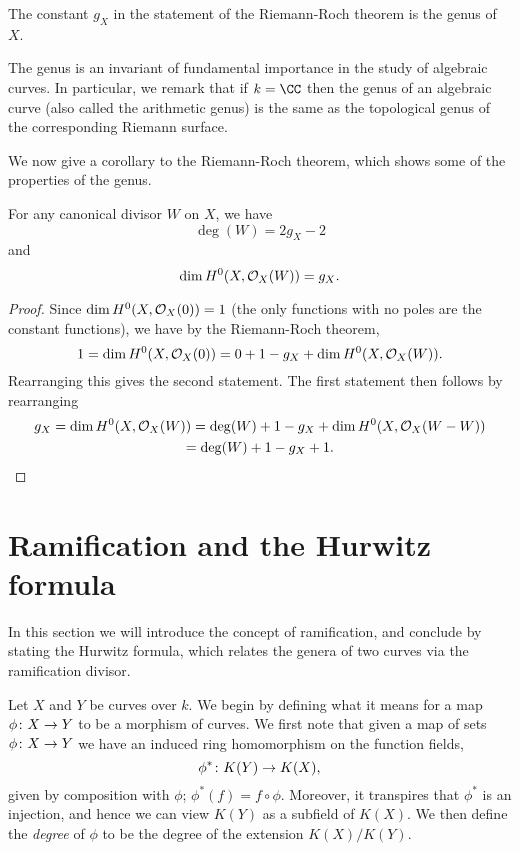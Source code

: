     \begin{defn}
    The constant $g_X$ in the statement of the Riemann-Roch theorem is the genus of $X$.
    \end{defn}

The genus is an invariant of fundamental importance in the study of algebraic curves.
In particular, we remark that if $k = \CC$ then the genus of an algebraic curve (also called the arithmetic genus) is the same as the topological genus of the corresponding Riemann surface.

We now give a corollary to the Riemann-Roch theorem, which shows some of the properties of the genus.

    \begin{cor}\label{dim=gc}
    For any canonical divisor $W$ on $X$, we have 
        \[
        \deg(W) = 2g_X-2
        \]
    and 
        \[
        \dim H^0(X,{\cal O}_X(W)) = g_X.
        \]
    \end{cor}
    \begin{proof}
    Since $\dim H^0(X,{\cal O}_X(0)) = 1$ (the only functions with no poles are the constant functions), we have by the Riemann-Roch theorem, 
        \[
        1= \dim H^0(X,{\cal O}_X(0)) = 0 + 1 -g_X + \dim H^0(X,{\cal O}_X(W)).
        \]
    Rearranging this gives the second statement.
    The first statement then follows by rearranging
        \begin{multline*}
        g_X = \dim H^0(X,{\cal O}_X(W)) = \deg(W) + 1 -g_X +  \dim H^0(X,{\cal O}_X(W-W))\\ = \deg(W) + 1 -g_X + 1.
        \end{multline*}
    \end{proof}

\section{Ramification and the Hurwitz formula}

In this section we will introduce the concept of ramification, and conclude by stating the Hurwitz formula, which relates the genera of two curves via the ramification divisor.



Let $X$ and $Y$ be curves over $k$.
We begin by defining what it means for a map $\phi \colon X \rightarrow Y$ to be a morphism of curves.
We first note that given a map of sets $\phi \colon X \rightarrow Y$ we have an induced ring homomorphism on the function fields,
    \[
    \phi^* \colon K(Y) \rightarrow K(X),
    \]
given by composition with $\phi$; \ie $\phi^*(f) = f \circ \phi$.
Moreover, it transpires that $\phi^*$ is an injection, and hence we can view $K(Y)$ as a subfield of $K(X)$.
We then define the \emph{degree} of $\phi$ to be the degree of the extension $K(X)/K(Y)$.

